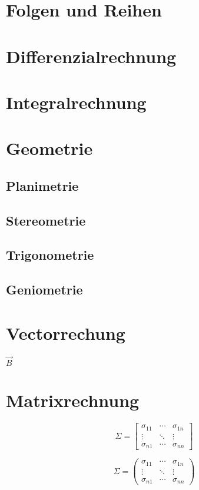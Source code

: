\documentclass[12pt,a4paper,fleqn,twoside,pdf,final]{article}
\begin{document}
\section{Folgen und Reihen}
\section{Differenzialrechnung}
\section{Integralrechnung}
\section{Geometrie}



\subsection{Planimetrie}
\subsection{Stereometrie}
\subsection{Trigonometrie}
\subsection{Geniometrie}
\section{Vectorrechung}
$\vec{B}$
\section{Matrixrechnung}

 
 $$
\Sigma=\left[
\begin{array}{ccc}
   \sigma_{11} & \cdots & \sigma_{1n} \\
   \vdots & \ddots & \vdots \\
   \sigma_{n1} & \cdots & \sigma_{nn}
\end{array}
\right]
$$

 $$
\Sigma=\left(
\begin{array}{ccc}
   \sigma_{11} & \cdots & \sigma_{1n} \\
   \vdots & \ddots & \vdots \\
   \sigma_{n1} & \cdots & \sigma_{nn}
\end{array}
\right)
$$
\end{document}
